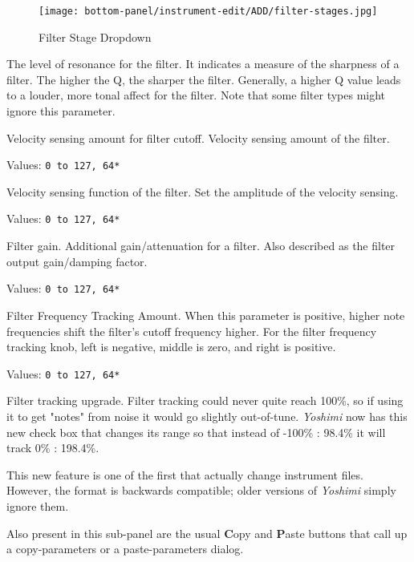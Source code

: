    \begin{figure}[H]
   \centering
   \texttt{[image: bottom-panel/instrument-edit/ADD/filter-stages.jpg]}
   \caption[Filter Stage Dropdown]{Filter Stage Dropdown}
   \label{fig:filter_stage_dropdown}
\end{figure}

   The level of resonance for the filter.
   It indicates a measure of the sharpness of a filter.
   The higher the Q, the sharper the filter.
   Generally, a higher Q value leads to a louder, more tonal
   affect for the filter.
   Note that some filter types might ignore this parameter.

   Velocity sensing amount for filter cutoff.
   Velocity sensing amount of the filter.

   Values: \texttt{0 to 127, 64*}

   Velocity sensing function of the filter.
   Set the amplitude of the velocity sensing.

   Values: \texttt{0 to 127, 64*}

   Filter gain.
   Additional gain/attenuation for a filter.
   Also described as the filter output gain/damping factor.

   Values: \texttt{0 to 127, 64*}

   Filter Frequency Tracking Amount.
   When this parameter is positive, higher note
   frequencies shift the filter’s cutoff frequency higher.
   For the filter frequency tracking knob, left is negative, middle is
   zero, and right is positive.

   Values: \texttt{0 to 127, 64*}

   Filter tracking upgrade.
   Filter tracking could never quite reach 100\%,
   so if using it to get "notes" from noise it would go slightly out-of-tune.
   \textsl{Yoshimi} now has this new check box that changes its range so that
   instead of -100\% : 98.4\% it will track 0\% : 198.4\%.

   This new feature is one of the first that actually change instrument files.
   However, the format is backwards compatible; older versions of
   \textsl{Yoshimi} simply ignore them.

   Also present in this sub-panel are the usual \textbf{C}opy
   and \textbf{P}aste buttons that call up a copy-parameters or
   a paste-parameters dialog.

